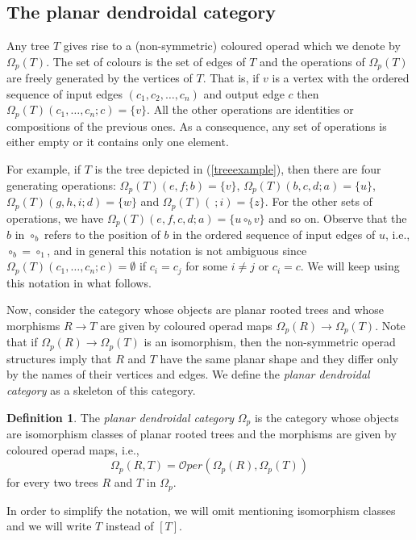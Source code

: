 \documentclass[a4paper]{amsart}
\theoremstyle{plain}
\theoremstyle{definition}
\newtheorem{dfn}[thm]{Definition}
\theoremstyle{remark}
\newcommand{\rpd}{\Omega_p}
\newcommand{\To}{\longrightarrow}
\newcommand{\Oper}{\mathcal{O}per}
\numberwithin{equation}{section}
\numberwithin{figure}{section}
\begin{document}
\subsection{The planar dendroidal category }\label{the basic category}
Any tree $T$ gives rise to a (non-symme\-tric) coloured operad which
we denote by $\Omega_p(T)$. The set of colours is the set of edges of
$T$ and the operations of $\Omega_p(T)$ are freely generated by the
vertices of $T$. That is, if $v$ is a vertex with the ordered
sequence of input edges $(c_1, c_2, \ldots, c_n)$ and output edge
$c$ then $\Omega_p(T)(c_1,\ldots,c_n;c)=\{v\}$. All the other
operations are identities or compositions of the previous ones. As a
consequence, any set of operations is either empty or it contains
only one element.

For example, if $T$ is the tree depicted in (\ref{treeexample}), then there are four generating operations:
$\Omega_p(T)(e,f;b)=\{v\}$, $\Omega_p(T)(b,c,d;a)=\{u\}$, $\Omega_p(T)(g,h,i;d)=\{w\}$ and $\Omega_p(T)(\ ;i)=\{z\}$.
For the other sets of operations, we have $\Omega_p(T)(e,f,c,d;a)=\{u\circ_b v\}$ and so on.
Observe that the $b$ in $\circ_b$ refers to the position of $b$ in the ordered sequence of input edges of $u$, i.e.,
$\circ_b=\circ_1$, and in general this notation is not ambiguous since $\Omega_p(T)(c_1,\ldots, c_n;c)=\emptyset$ if $c_i=c_j$
for some $i\neq j$ or $c_i=c$. We will keep using this notation in what follows.

Now, consider the category whose objects are planar rooted trees and whose morphisms $R\To T$ are given by coloured
operad maps $\Omega_p(R)\To\Omega_p(T)$. Note that if $\Omega_p(R)\longrightarrow \Omega_p(T)$ is an isomorphism, then the
non-symmetric operad structures imply that $R$ and $T$ have the same planar shape and they differ only by the names of
their vertices and edges. We define the \textit{planar dendroidal category} as a skeleton of this category.

\begin{dfn}
The \emph{planar dendroidal category} $\rpd$ is the category whose objects are isomorphism classes of
planar rooted trees and the morphisms are given by coloured operad maps, i.e.,
$$
\rpd(R,T)=\Oper(\Omega_p(R), \Omega_p(T))
$$
for every two trees $R$ and $T$ in $\rpd$.
\end{dfn}

In order to simplify the notation, we will omit mentioning
isomorphism classes and we will write $T$ instead of $[T]$.
\end{document}
